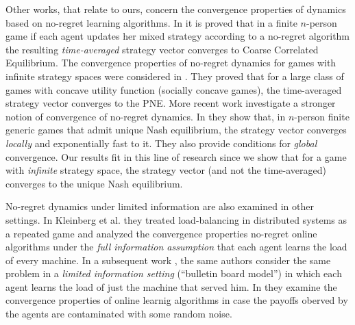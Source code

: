 Other works, that relate to ours, concern the convergence
properties of dynamics based on no-regret learning algorithms.
In \cite{FV97,FS99,SA00,SALS15} it is proved that in a finite $n$-person
game if each agent updates her mixed strategy according to a no-regret
algorithm the resulting \emph{time-averaged} strategy vector converges to
Coarse Correlated Equilibrium. The convergence properties of no-regret dynamics 
for games with infinite strategy spaces were considered in \cite{EMN09}.
They proved that for a large class of games with concave utility function
(socially concave games), the time-averaged strategy vector converges to
the PNE. More recent work investigate a stronger notion of convergence of
no-regret dynamics. In \cite{CHM17} they show that,
in $n$-person finite generic games that admit unique Nash equilibrium,
the strategy vector converges \emph{locally} and exponentially fast
to it. They also provide conditions for \emph{global} convergence.
Our results fit in this line of research since we show that
for a game with \emph{infinite} strategy space, the strategy vector
(and not the time-averaged) converges to the unique Nash equilibrium.

No-regret dynamics under limited information are also examined
in other settings. In Kleinberg et al. \cite{KPT09} they treated 
load-balancing in distributed systems as
a repeated game and analyzed the convergence properties
no-regret online algorithms under the \emph{full information assumption} 
that each agent learns the load of every machine. 
In a subsequent work \cite{KPT11}, the same authors consider the
same problem in a \emph{limited information setting} (\enquote{bulletin board model})
in which each agent learns the load of just the machine 
that served him. In \cite{HCM17,MS17} they examine the convergence
properties of online learnig algorithms in case the payoffs oberved 
by the agents are contaminated with some random noise. 

